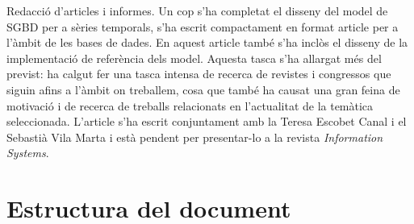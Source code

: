 Redacció d'articles i informes. Un cop s'ha completat
  el disseny del model de SGBD per a sèries temporals, s'ha escrit
  compactament en format article per a l'àmbit de les bases de dades.
  En aquest article també s'ha inclòs el disseny de la implementació
  de referència dels model.  Aquesta tasca s'ha allargat més del
  previst: ha calgut fer una tasca intensa de recerca de revistes i
  congressos que siguin afins a l'àmbit on treballem, cosa que també
  ha causat una gran feina de motivació i de recerca de treballs
  relacionats en l'actualitat de la temàtica seleccionada.  L'article
  s'ha escrit conjuntament amb la Teresa Escobet Canal i el Sebastià
  Vila Marta i està pendent per presentar-lo a la revista
  \emph{Information Systems}.















\section{Estructura del document}












